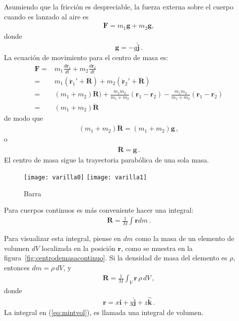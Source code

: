 \begin{itemize}
Asumiendo que la fricción es despreciable, la fuerza externa sobre el cuerpo cuando es lanzado al aire es
\begin{align}
  \mathbf{F}=m_1\mathbf{g}+m_2\mathbf{g},
\end{align}
donde
\begin{align}
  \mathbf{g}=-g\hat{\mathbf{j}}\,.
\end{align}
La ecuación de movimiento para el centro de masa es:
\begin{align*}
  \mathbf{F}=&m_1\frac{d\dot{\mathbf{r}}_1}{dt}+m_2\frac{d\dot{\mathbf{r}_2}}{dt}\nonumber\\
=&m_1(\ddot{\mathbf{r}}_1'+\ddot{\mathbf{R}})+m_2(\ddot{\mathbf{r}}_2'+\ddot{\mathbf{R}})\nonumber\\
=&(m_1+m_2)\ddot{\mathbf{R}})+\frac{m_1m_2}{m_1+m_2}(\mathbf{r}_1-\mathbf{r}_2)
                            -\frac{m_1m_2}{m_1+m_2}(\mathbf{r}_1-\mathbf{r}_2)\nonumber\\
=&(m_1+m_2)\ddot{\mathbf{R}}
\end{align*}
de modo que
\begin{align}
  \left(m_1+m_2 \right)\ddot{\mathbf{R}}=\left(m_1+m_2 \right)\mathbf{g}\,,
\end{align}
o
\begin{align}
  \ddot{\mathbf{R}}=\mathbf{g}\,.
\end{align}
El centro de masa sigue la trayectoria parabólica de una sola masa.
\end{itemize}

\begin{frame}
  \begin{figure}
    \centering
{\texttt{[image: varilla0]}}
{\texttt{[image: varilla1]}}
    \caption{Barra}
    \label{fig:varilla}
  \end{figure}
\end{frame}
Para cuerpos continuos es más conveniente hacer una integral:
\begin{align}
  \mathbf{R}=\frac{1}{M}\int \mathbf{r} dm\,.
\end{align}

Para visualizar esta integral, piense en $dm$ como la masa de un elemento de volumen $dV$ localizada en la posición $\mathbf{r}$, como se muestra en la figura~\ref{fig:centrodemasacontinuo}. Si la densidad de masa del elemento es $\rho$, entonces $dm=\rho\,dV$, y
\begin{align}
\label{eq:mintvol}
  \mathbf{R}=\frac{1}{M}\int_V \mathbf{r}\,\rho\,dV\,, 
\end{align}
donde
\begin{align}
  \mathbf{r}=x\hat{\mathbf{i}}+y\hat{\mathbf{j}}+z\hat{\mathbf{k}}\,.
\end{align}
La integral en (\ref{eq:mintvol}), es llamada una integral de volumen.

